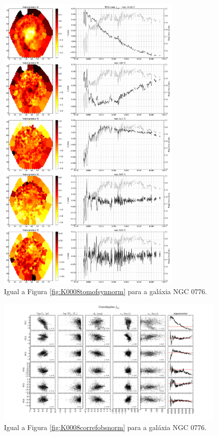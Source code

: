 \begin{figure}
    \includegraphics[width=0.8\textwidth]{figuras/K0073-tomo-syn-norm.pdf}
    \caption[Tomogramas de 1 a 5 para o cubo $f_{syn}$ - NGC 0776.]
    {Igual a Figura \ref{fig:K0008tomofsynnorm} para a galáxia NGC 0776.}
    \label{fig:K0073tomofsynnorm}
\end{figure}

\begin{figure}
    \includegraphics[width=1.2\textwidth, angle=-90]{figuras/K0073-correl-f_obs_norm-PCvsPhys.pdf}
	\caption[Correlações PCs vs. par\^ametros f\'isicos - $f_{obs}$ - NGC 0776]
	{Igual a Figura \ref{fig:K0008correfobsnorm} para a galáxia NGC 0776.}
    \label{fig:K0073correfobsnorm}
\end{figure}

